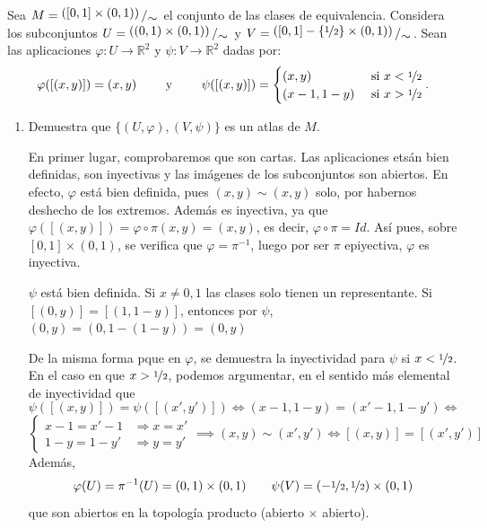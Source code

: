 \begin{ejer}
    Sea $M = \modulo{([0, 1] \times (0, 1))}{\sim}$ el conjunto de las clases de equivalencia. Considera los subconjuntos $U = \modulo{((0, 1) \times (0, 1))}{\sim}$ y $V =  \modulo{([0, 1] - \{\nicefrac{1}{2}\} \times (0, 1))}{\sim}$. Sean las aplicaciones $\varphi : U \to \mathbb R^2$ y $\psi : V \to \mathbb R^2$ dadas por: 
    $$\varphi([(x,y)]) = (x,y) \qquad \text{ y } \qquad \psi([(x,y)])=\begin{cases}
        (x,y) & \text{ si } x < \nicefrac{1}{2} \\  (x-1,1-y) & \text{ si } x > \nicefrac{1}{2} 
    \end{cases}.$$
    \begin{enumerate}
        \item Demuestra que $\{(U, \varphi), (V, \psi)\}$ es un atlas de $M$.
        \begin{sol}
            En primer lugar, comprobaremos que son cartas. Las aplicaciones ets\'an bien definidas, son inyectivas y las im\'agenes de los subconjuntos son abiertos. En efecto, $\varphi$ est\'a bien definida, pues $(x,y)\sim (x,y)$ solo, por habernos deshecho de los extremos. Adem\'as es inyectiva, ya que $\varphi([(x,y)]) = \varphi \circ \pi (x,y) =(x,y)$, es decir, $\varphi \circ \pi = Id$. As\'i pues, sobre $[0, 1] \times (0, 1)$, se verifica que $\varphi = \pi^{-1}$, luego por ser $\pi$ epiyectiva, $\varphi$ es inyectiva.
            
             $\psi$ est\'a bien definida. Si $x \neq 0,1$ las clases solo tienen un representante. Si $[(0,y)]=[(1,1-y)]$, entonces por $\psi$, $(0,y) = (0,1-(1-y))=(0,y)$
             
            De la misma forma pque en $\varphi$, se demuestra la inyectividad para $\psi$ si $x < \nicefrac{1}{2}$. En el caso en que $x > \nicefrac{1}{2}$, podemos argumentar, en el sentido m\'as elemental de inyectividad que
            $$\psi([(x,y)]) = \psi([(x',y')]) \iff (x-1,1-y)=(x'-1,1-y') \iff  $$
            $$\begin{cases}
                x-1=x'-1 & \Rightarrow x=x' \\ 1-y = 1-y' & \Rightarrow y=y'
            \end{cases} \implies (x,y) \sim (x',y') \iff [(x,y)] = [(x',y')]$$
            Adem\'as, 
            $$\varphi(U)=\pi^{-1}(U) =(0,1) \times (0,1) \qquad \psi(V)= (-\nicefrac{1}{2},\nicefrac{1}{2})  \times (0,1)$$
            que son abiertos en la topología producto (abierto $\times$ abierto).


\end{sol}
\end{enumerate}
\end{ejer}
